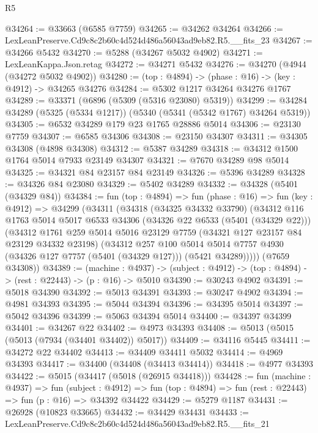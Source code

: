 \begin{lexlean}{R5}
\begin{coremodule}
@34264 := @33663 (@6585 @7759)
@34265 := @34262 @34264
@34266 := LexLeanPreserve.Cd9c8c2b60c4d524d486a56043ad9eb82.R5.__fits_23
@34267 := @34266 @5432
@34270 := @5288 (@34267 @5032 @4902)
@34271 := LexLeanKappa.Json.retag
@34272 := @34271 @5432
@34276 := @34270 (@4944 (@34272 @5032 @4902))
@34280 := (top : @4894) -> (phase : @16) -> (key : @4912) -> @34265 @34276
@34284 := @5302 @1217 @34264 @34276 @1767
@34289 := @33371 (@6896 (@5309 (@5316 @23080) @5319))
@34299 := @34284 @34289 (@5325 (@5334 @1217)) (@5340 (@5341 (@5342 @1767) @34264 @5319))
@34305 := @6532 @34289 @179 @23 @1765 @28886 @5014
@34306 := @23130 @7759
@34307 := @6585 @34306
@34308 := @23150 @34307
@34311 := @34305 @34308 (@4898 @34308)
@34312 := @5387 @34289
@34318 := @34312 @1500 @1764 @5014 @7933 @23149 @34307
@34321 := @7670 @34289 @98 @5014
@34325 := @34321 @84 @23157 @84 @23149
@34326 := @5396 @34289
@34328 := @34326 @84 @23080
@34329 := @5402 @34289
@34332 := @34328 (@5401 (@34329 @84))
@34384 := fun (top : @4894) =>
  fun (phase : @16) =>
  fun (key : @4912) =>
  @34299
    (@34311
      (@34318
        (@34325 @34332 @33790)
        (@34312
          @116
          @1763
          @5014
          @5017
          @6533
          @34306
          (@34326 @22 @6533 (@5401 (@34329 @22)))
          (@34312
            @1761
            @259
            @5014
            @5016
            @23129
            @7759
            (@34321 @127 @23157 @84 @23129 @34332 @23198)
            (@34312
              @257
              @100
              @5014
              @5014
              @7757
              @4930
              (@34326 @127 @7757 (@5401 (@34329 @127)))
              (@5421 @34289)))))
      (@7659 @34308))
@34389 := (machine : @4937) ->
  (subject : @4912) -> (top : @4894) -> (rest : @22443) -> (p : @16) -> @5010
@34390 := @30243 @4902
@34391 := @5018 @34390
@34392 := @5013 @34391
@34393 := @30247 @4902
@34394 := @4981 @34393
@34395 := @5044 @34394
@34396 := @34395 @5014
@34397 := @5042 @34396
@34399 := @5063 @34394 @5014
@34400 := @34397 @34399
@34401 := @34267 @22
@34402 := @4973 @34393
@34408 := @5013 (@5015 (@5013 (@7934 (@34401 @34402)) @5017))
@34409 := @34116 @5445
@34411 := @34272 @22 @34402
@34413 := @34409 @34411 @5032
@34414 := @4969 @34393
@34417 := @34400 (@34408 (@34413 @34414))
@34418 := @4977 @34393
@34422 := @5015 (@34417 (@5018 (@26915 @34418)))
@34428 := fun (machine : @4937) =>
  fun (subject : @4912) =>
  fun (top : @4894) => fun (rest : @22443) => fun (p : @16) => @34392 @34422
@34429 := @5279 @1187
@34431 := @26928 (@10823 @33665)
@34432 := @34429 @34431
@34433 := LexLeanPreserve.Cd9c8c2b60c4d524d486a56043ad9eb82.R5.__fits_21

\end{coremodule}
\end{lexlean}
